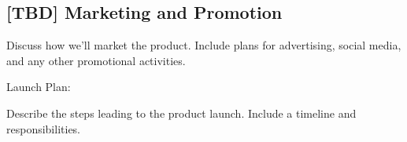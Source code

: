 
\subsection{[TBD] Marketing and Promotion}

Discuss how we'll market the product.
Include plans for advertising, social media, and any other promotional activities.

Launch Plan:

    Describe the steps leading to the product launch.
    Include a timeline and responsibilities.
